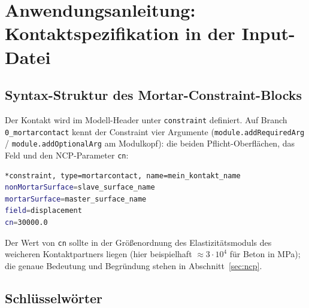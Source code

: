 \documentclass[a4paper,11pt]{article}
\newcommand{\code}[1]{\texttt{\small #1}}
\let\stdsection\section
\renewcommand{\section}{\clearpage\stdsection}
\begin{document}
\appendix
\section{Anwendungsanleitung: Kontaktspezifikation in der Input-Datei}
\label{sec:inputfile}

\subsection{Syntax-Struktur des Mortar-Constraint-Blocks}

Der Kontakt wird im Modell-Header unter \code{*constraint} definiert. Auf Branch
\code{0\_mortarcontact} kennt der Constraint vier Argumente (\code{module.addRequiredArg} / \code{module.addOptionalArg} am Modulkopf): die
beiden Pflicht-Oberflächen, das Feld und den NCP-Parameter \code{cn}:

\begin{lstlisting}[language=bash,caption={Mortar-Kontakt-Block (reibungsfrei) in der EdelweissFE Input-Datei}]
*constraint, type=mortarcontact, name=mein_kontakt_name
nonMortarSurface=slave_surface_name
mortarSurface=master_surface_name
field=displacement
cn=30000.0
\end{lstlisting}

Der Wert von \code{cn} sollte in der Größenordnung des Elastizitätsmoduls des weicheren
Kontaktpartners liegen (hier beispielhaft $\approx3\cdot10^4$ für Beton in MPa); die genaue
Bedeutung und Begründung stehen in Abschnitt~\ref{sec:ncp}.

\subsection{Schlüsselwörter}
\end{document}
